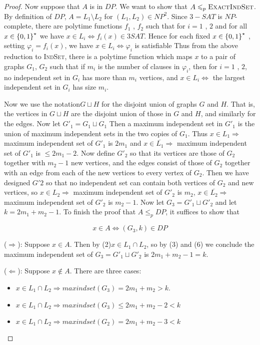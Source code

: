 \begin{proof}
    Now suppose that $A$ is in $DP$. We want to show that $A \leqslant_p \textsc{ExactIndSet}$. By definition of $DP$, $A = L_1 \setminus L_2$ for $(L_1,L_2) \in NP^2$. Since $3-SAT$ is $NP$-complete, there are polytime functions $f_1$ , $f_2$ such that for $i = 1$ , $2$ and for all  $x \in \left\{  0 , 1  \right\}^\star$ we have $x \in L_i \Leftrightarrow f_i ( x ) \in 3 SAT$. Hence for each fixed $x \in \left\{  0 , 1  \right\}^\star$ , setting $\varphi_i = f_i(x)$, we have  $x \in L_i \Leftrightarrow \varphi_i$ is satisfiable Thus from the above reduction to \textsc{IndSet}, there is a polytime function which maps $x$ to a pair of graphs $G_1$, $G_2$ such that if $m_i$ is the number of clauses in $\varphi_i$, then for $i = 1$ , $2$, no independent set in $G_i$ has more than $m_i$ vertices, and $x \in  L_i \Leftrightarrow$ the largest independent set in $G_i$ has size $m_i$.
    
    Now we use the notation$ G\sqcup H$ for the disjoint union of graphs $G$ and $H$. That is, the vertices in $G\sqcup H$ are the disjoint union of those in $G$ and $H$, and similarly for the edges. Now let $G'_1=G_1\sqcup G_1$ Then a maximum independent set in $G'_1$ is the union of maximum independent sets in the two copies of $G_1$. Thus $x\in L_1\Rightarrow$ maximum independent set of $G'_1$ is $2m_1$ and $x\in \overline{L_1} \Rightarrow$ maximum independent set of $G'_1$ is $\leqslant 2m_1-2$. Now define $G'_2$ so that its vertices are those of $G_2$ together with $m_2-1$ new vertices, and the edges consist of those of $G_2$ together with an edge from each of the new vertices to every vertex of $G_2$. Then we have designed $G'2$ so that no independent set can contain both vertices of $G_2$ and new vertices, so $x\in L_2 \Rightarrow$ maximum independent set of $G'_2$ is $m_2$, $x\in \overline{L_2} \Rightarrow$ maximum independent set of $G'_2$ is $m_2-1$. Now let $G_3=G'_1\sqcup G'_2$ and let $k= 2m_1+m_2-1$. To finish the proof that $A\leqslant_p DP$, it suffices to show that 
    
    \begin{lemma}
        $$x\in A\Leftrightarrow(G_3, k)\in DP$$
    \end{lemma}
    
    ($\Rightarrow$): Suppose $x\in A$. Then by (2)$x\in L_1 \cap L_2$, so by (3) and (6) we conclude the maximum independent set of $G_3=G'_1\sqcup  G'_2$ is $2m_1+m_2-1 =k$.
    
    ($\Leftarrow$): Suppose $x \not\in A$. There are three cases:
    \begin{itemize}
        \item $x\in L_1 \cap L_2\Rightarrow maxindset(G_3) = 2m_1+m_2> k$.
        \item $x\in L_1 \cap L_2\Rightarrow maxindset(G_3)\leqslant 2m_1+m_2-2< k$
        \item $x\in L_1 \cap L_2\Rightarrow maxindset(G_2) = 2m_1+m_2-3< k$
    \end{itemize}
\end{proof}

